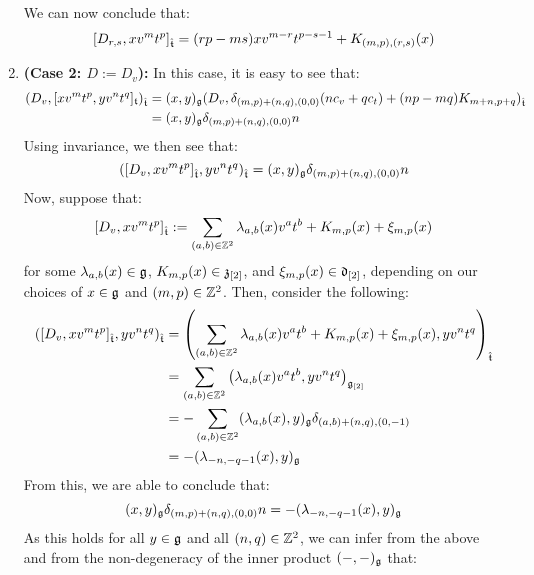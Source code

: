 \begin{remark}
\begin{enumerate}
                We can now conclude that:
                    $$[D_{r, s}, x v^m t^p]_{\hat{\mathfrak{t}}} = ( rp - ms ) x v^{m - r} t^{p - s - 1} + K_{(m, p), (r, s)}(x)$$
                \item \textbf{(Case 2: $D := D_v$):} In this case, it is easy to see that:
                    $$
                        \begin{aligned}
                            ( D_v, [x v^m t^p, y v^n t^q]_{\mathfrak{t}} )_{\hat{\mathfrak{t}}} & = (x, y)_{\mathfrak{g}} ( D_v, \delta_{(m, p) + (n, q), (0, 0)} ( n c_v + q c_t ) + (np - mq) K_{m + n, p + q} )_{\hat{\mathfrak{t}}}
                            \\
                            & = (x, y)_{\mathfrak{g}} \delta_{(m, p) + (n, q), (0, 0)} n
                        \end{aligned}
                    $$
                Using invariance, we then see that:
                    $$( [D_v, x v^m t^p]_{\hat{\mathfrak{t}}}, y v^n t^q )_{\hat{\mathfrak{t}}} = (x, y)_{\mathfrak{g}} \delta_{(m, p) + (n, q), (0, 0)} n$$
                Now, suppose that:
                    $$[D_v, x v^m t^p]_{\hat{\mathfrak{t}}} := \sum_{(a, b) \in \mathbb{Z}^2} \lambda_{a, b}(x) v^a t^b + K_{m, p}(x) + \xi_{m, p}(x)$$
                for some $\lambda_{a, b}(x) \in \mathfrak{g}$, $K_{m, p}(x) \in \mathfrak{z}_{[2]}$, and $\xi_{m, p}(x) \in \mathfrak{d}_{[2]}$, depending on our choices of $x \in \mathfrak{g}$ and $(m, p) \in \mathbb{Z}^2$. Then, consider the following:
                    $$
                        \begin{aligned}
                            ( [D_v, x v^m t^p]_{\hat{\mathfrak{t}}}, y v^n t^q )_{\hat{\mathfrak{t}}} & = \left( \sum_{(a, b) \in \mathbb{Z}^2} \lambda_{a, b}(x) v^a t^b + K_{m, p}(x) + \xi_{m, p}(x), y v^n t^q \right)_{\hat{\mathfrak{t}}}
                            \\
                            & = \sum_{(a, b) \in \mathbb{Z}^2} \left( \lambda_{a, b}(x) v^a t^b, y v^n t^q \right)_{\mathfrak{g}_{[2]}}
                            \\
                            & = -\sum_{(a, b) \in \mathbb{Z}^2} (\lambda_{a, b}(x), y)_{\mathfrak{g}} \delta_{ (a, b) + (n, q), (0, -1) }
                            \\
                            & = -(\lambda_{-n, -q - 1}(x), y)_{\mathfrak{g}}
                        \end{aligned}
                    $$
                From this, we are able to conclude that:
                    $$(x, y)_{\mathfrak{g}} \delta_{(m, p) + (n, q), (0, 0)} n = -(\lambda_{-n, -q - 1}(x), y)_{\mathfrak{g}}$$
                As this holds for all $y \in \mathfrak{g}$ and all $(n, q) \in \mathbb{Z}^2$, we can infer from the above and from the non-degeneracy of the inner product $(-, -)_{\mathfrak{g}}$ that:

\end{enumerate}
\end{remark}

